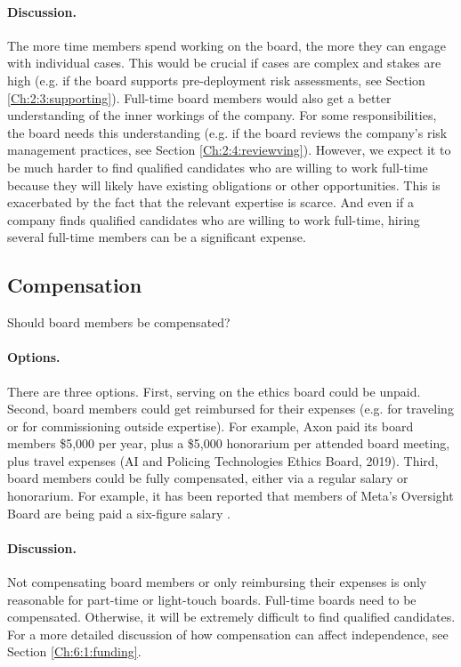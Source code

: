 \documentclass{article}
\begin{document}
\paragraph{Discussion.} The more time members spend working on the board, the more they can engage with individual cases. This would be crucial if cases are complex and stakes are high (e.g. if the board supports pre-deployment risk assessments, see Section \ref{Ch:2:3:supporting}). Full-time board members would also get a better understanding of the inner workings of the company. For some responsibilities, the board needs this understanding (e.g. if the board reviews the company’s risk management practices, see Section \ref{Ch:2:4:reviewving}). However, we expect it to be much harder to find qualified candidates who are willing to work full-time because they will likely have existing obligations or other opportunities. This is exacerbated by the fact that the relevant expertise is scarce. And even if a company finds qualified candidates who are willing to work full-time, hiring several full-time members can be a significant expense.

\subsection{Compensation}\label{Ch:4:6:compensation}

Should board members be compensated?

\paragraph{Options.} There are three options. First, serving on the ethics board could be unpaid. Second, board members could get reimbursed for their expenses (e.g. for traveling or for commissioning outside expertise). For example, Axon paid its board members \$5,000 per year, plus a \$5,000 honorarium per attended board meeting, plus travel expenses (AI and Policing Technologies Ethics Board, 2019). Third, board members could be fully compensated, either via a regular salary or honorarium. For example, it has been reported that members of Meta’s Oversight Board are being paid a six-figure salary \cite{klonick2021insights}.

\paragraph{Discussion.} Not compensating board members or only reimbursing their expenses is only reasonable for part-time or light-touch boards. Full-time boards need to be compensated. Otherwise, it will be extremely difficult to find qualified candidates. For a more detailed discussion of how compensation can affect independence, see Section \ref{Ch:6:1:funding}.
\end{document}
